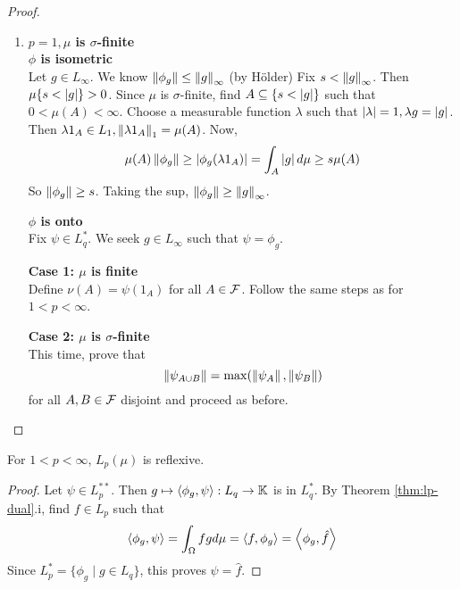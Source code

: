 \documentclass{article}
\begin{document}
\begin{proof}
\begin{enumerate}
    {\bf Case 3: General $n$} \\
    First observe that, for $f \in L_p(\mu)$, $\{f \ne 0\}$ is $\sigma$-finite. Indeed,
    $$\{f \ne 0\} = \Union_n \curlybrack{\frac 1n < \abs f}$$
    and
    $$\mu\curlybrack{\frac 1n < \abs f} \le \abs{n ^ p} \norm f_p^p < \infty \text{ by Markov}$$
    Choose $f_n \in B_{L_p}$ such that $\psi(f_n) \to \norm\psi$. Then $A = \Union_n\{f_n \ne 0\}$ is $\sigma$-finite and $\norm{\psi_A} = \norm\psi$. By the claim,
    $$\norm\psi = \left(\norm{\psi_A}^q + \norm{\psi_{A^c}}^q\right)^{\frac 1q}$$
    So $\Psi_{A^c} = 0$. By Case 2, find $g \in L_q(\mu_A) \subseteq L_q(\mu)$ such that $\psi_A = \phi_g$, so that
    $$\psi(f) = \psi_A{f\restriction_A} + \psi{A^c}(f\restriction{A^c}) = \int_A fg d\mu + 0 = \int_\Omega fg d\mu$$
    \item {\bf $p = 1, \mu$ is $\sigma$-finite} \\
    {\bf $\phi$ is isometric} \\
    Let $g \in L_\infty$. We know $\left\lVert \phi_g\right\rVert \le \left\lVert g\right\rVert_\infty$ (by Hölder) Fix $s < \left\lVert g\right\rVert_\infty$. Then $\mu\{s < \left\lvert g\right\rvert\} > 0$. Since $\mu$ is $\sigma$-finite, find $A \subseteq \{s < \left\lvert g\right\rvert\}$ such that $0 < \mu(A) < \infty$. Choose a measurable function $\lambda$ such that $\left\lvert \lambda\right\rvert = 1, \lambda g = \left\lvert g\right\rvert$. Then $\lambda 1_A \in L_1, \left\lVert \lambda 1_A\right\rVert_1 = \mu(A)$. Now,
    $$\mu(A)\left\lVert \phi_g\right\rVert \ge \left\lvert \phi_g(\lambda 1_A)\right\rvert = \int_A \left\lvert g\right\rvert d\mu \ge s\mu(A)$$
    So $\left\lVert \phi_g\right\rVert \ge s$. Taking the sup, $\left\lVert \phi_g\right\rVert \ge \left\lVert g\right\rVert_\infty$.

    {\bf $\phi$ is onto} \\
    Fix $\psi \in L_q^*$. We seek $g \in L_\infty$ such that $\psi = \phi_g$.

    {\bf Case 1: $\mu$ is finite} \\
    Define $\nu(A) = \psi(1_A)$ for all $A \in \mathcal F$. Follow the same steps as for $1 < p < \infty$.

    {\bf Case 2: $\mu$ is $\sigma$-finite} \\
    This time, prove that
    $$\left\lVert \psi_{A \cup B}\right\rVert = \max(\left\lVert \psi_A\right\rVert, \left\lVert \psi_B\right\rVert)$$
    for all $A, B \in \mathcal F$ disjoint and proceed as before.
  \end{enumerate}
\end{proof}

\begin{cor}
  For $1 < p < \infty$, $L_p(\mu)$ is reflexive.
\end{cor}
\begin{proof}
  Let $\psi \in L_p^{**}$. Then $g \mapsto \left\langle \phi_g, \psi\right\rangle : L_q \to \mathbb K$ is in $L_q^*$. By Theorem \ref{thm:lp-dual}.i, find $f \in L_p$ such that
  $$\left\langle \phi_g, \psi\right\rangle = \int_\Omega fg d\mu = \left\langle f, \phi_g\right\rangle = \left\langle \phi_g, \hat f\right\rangle$$
  Since $L_p^* = \{\phi_g \mid g \in L_q\}$, this proves $\psi = \hat f$.
\end{proof}
\end{document}
